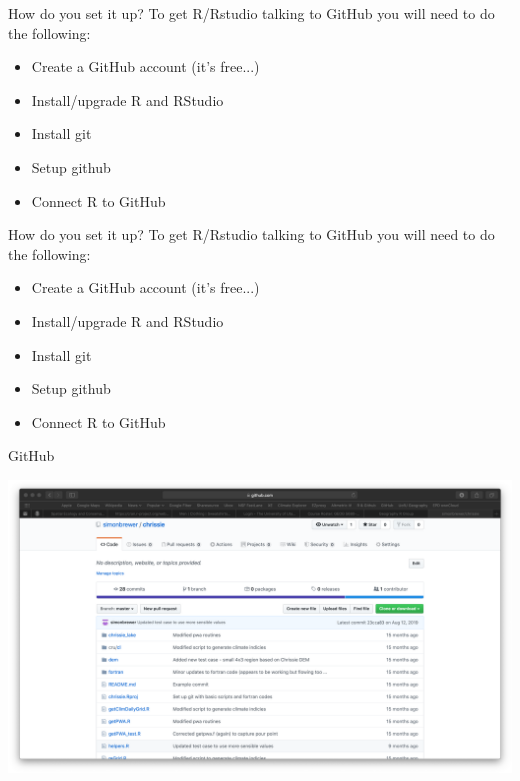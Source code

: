 \documentclass[aspectratio=169]{beamer}\usepackage[]{graphicx}\usepackage[]{color}
\begin{document}
\begin{frame}[fragile]{How do you set it up?}
To get R/Rstudio talking to GitHub you will need to do the following:
\begin{itemize}
  \item	Create a GitHub account (it's free...)
  \item	Install/upgrade R and RStudio
  \item	Install git
  \item	Setup github
  \item	Connect R to GitHub
\end{itemize}
\end{frame}

\begin{frame}[fragile]{How do you set it up?}
To get R/Rstudio talking to GitHub you will need to do the following:
\begin{itemize}
  \item	Create a GitHub account (it's free...)
  \item	Install/upgrade R and RStudio
  \item	Install git
  \item	Setup github
  \item	Connect R to GitHub
\end{itemize}
\end{frame}

\begin{frame}{GitHub}
	\begin{center}
		\includegraphics[width=.85\textwidth]{./images/github2.png}
	\end{center}
\end{frame}
\end{document}

